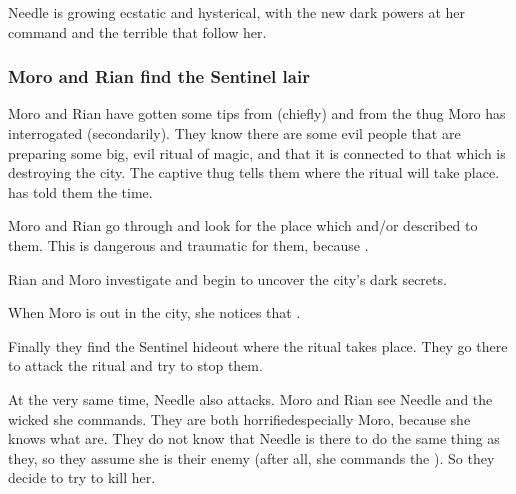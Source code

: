 Needle is growing ecstatic and hysterical, with the new dark powers at her command and the terrible \banes{} that follow her.






\subsubsection{Moro and Rian find the Sentinel lair}
Moro and Rian have gotten some tips from \Nasshikerr (chiefly) and from the thug Moro has interrogated (secondarily).
They know there are some evil people that are preparing some big, evil ritual of magic, and that it is connected to that which is destroying the city.
The captive thug tells them where the ritual will take place. 
\Nasshikerr has told them the time. 

Moro and Rian go through \Malcur and look for the place which  and/or  described to them. 
This is dangerous and traumatic for them, because . 

Rian and Moro investigate and begin to uncover the city's dark secrets. 

When Moro is out in the city, she notices that . 

Finally they find the Sentinel hideout where the ritual takes place. 
They go there to attack the ritual and try to stop them.

At the very same time, Needle also attacks.
Moro and Rian see Needle and the wicked \banes she commands. 
They are both horrified\dash{}especially Moro, because she knows what \banes are. 
They do not know that Needle is there to do the same thing as they, so they assume she is their enemy (after all, she commands the \banes).
So they decide to try to kill her. 





